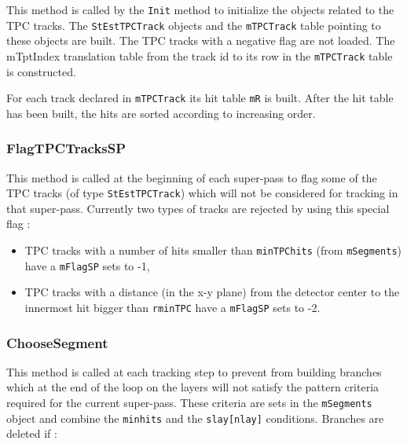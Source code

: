\documentclass[twoside]{article}
\begin{document}
This method is called by the \verb+Init+  method to
initialize the objects related to the TPC tracks. The
\verb+StEstTPCTrack+ objects and the \verb+mTPCTrack+ 
table pointing to these objects are built. The TPC tracks with a
negative flag are not loaded. The mTptIndex translation table from the
track id to its row in the \verb+mTPCTrack+ table is constructed. 

For each track declared in \verb+mTPCTrack+ its hit table \verb+mR+ is built.
After the hit table has been built, the hits are sorted according to increasing order.

\subsubsection{FlagTPCTracksSP}
\label{sec:FlagTPCTracksSPq}

This method is called at the beginning of each super-pass to flag
some of the TPC tracks (of type \verb+StEstTPCTrack+) which will not
be considered for tracking in that super-pass. Currently two types of
tracks are rejected by using this special flag :

\begin{itemize}
\item 	TPC tracks with a number of hits 
smaller than \verb+minTPChits+ (from \verb+mSegments+) have a  
\verb+mFlagSP+ sets to -1,
\item TPC tracks with a distance (in the x-y plane) from the detector 
center to the innermost hit bigger than \verb+rminTPC+ have a \verb+mFlagSP+ sets to -2.
\end{itemize}



\subsubsection{ChooseSegment}
\label{sec:ChooseSegmentq}

This method is called at each tracking step to prevent from building
branches which at the end of the loop on the layers will not satisfy
the pattern criteria required for the current super-pass. These
criteria are sets in the \verb+mSegments+ object
 and combine the \verb+minhits+ and the
\verb+slay[nlay]+ conditions. Branches are deleted if :
\end{document}
